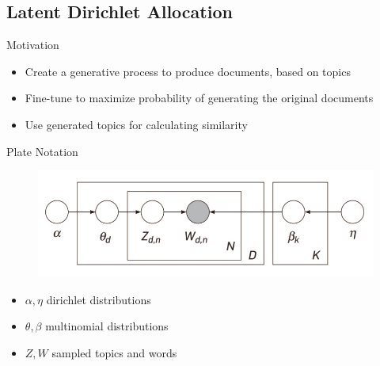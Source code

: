\subsection{Latent Dirichlet Allocation}
\begin{frame}{\insertsubsection}{Motivation}
    \begin{itemize}
        \item Create a generative process to produce documents, based on topics
        \item Fine-tune to maximize probability of generating the original documents
        \item Use generated topics for calculating similarity
    \end{itemize}
\end{frame}

\begin{frame}{\insertsubsection}{Plate Notation}
    \begin{figure}
        \centering
        \includegraphics[width = 1 \textwidth]{figures/lda_model.jpg}
    \end{figure}
    \begin{itemize}
        \item $\alpha, \eta$ dirichlet distributions
        \item $\theta, \beta$ multinomial distributions
        \item $Z, W$ sampled topics and words
    \end{itemize}
\end{frame}


